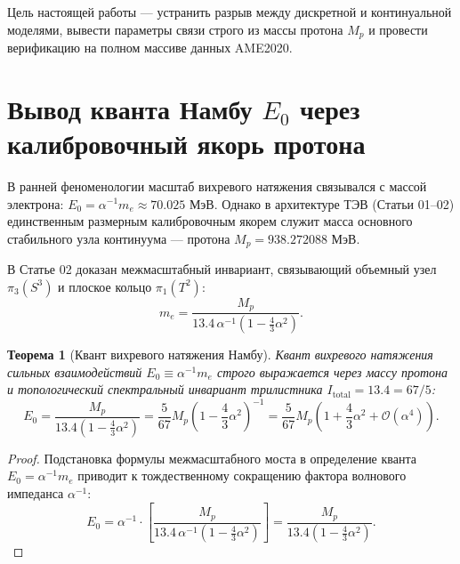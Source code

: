 \documentclass[11pt,a4paper]{article}
\newtheorem{theorem}{Теорема}
\theoremstyle{definition}
\theoremstyle{remark}
\begin{document}
Цель настоящей работы — устранить разрыв между дискретной и континуальной моделями, вывести параметры связи строго из массы протона $M_p$ и провести верификацию на полном массиве данных AME2020.

\section{Вывод кванта Намбу $E_0$ через калибровочный якорь протона}
В ранней феноменологии масштаб вихревого натяжения связывался с массой электрона: $E_0 = \alpha^{-1} m_e \approx 70.025\text{ МэВ}$. Однако в архитектуре ТЭВ (Статьи 01--02) единственным размерным калибровочным якорем служит масса основного стабильного узла континуума — протона $M_p = 938.272088\text{ МэВ}$.

В Статье 02 доказан межмасштабный инвариант, связывающий объемный узел $\pi_3(S^3)$ и плоское кольцо $\pi_1(T^2)$:
\begin{equation}
    m_e = \frac{M_p}{13.4 \, \alpha^{-1} \left(1 - \frac{4}{3}\alpha^2\right)}.
\end{equation}

\begin{theorem}[Квант вихревого натяжения Намбу]
\label{thm:nambu_proton}
Квант вихревого натяжения сильных взаимодействий $E_0 \equiv \alpha^{-1} m_e$ строго выражается через массу протона и топологический спектральный инвариант трилистника $I_{\mathrm{total}} = 13.4 = 67/5$:
\begin{equation}
    E_0 = \frac{M_p}{13.4 \left(1 - \frac{4}{3}\alpha^2\right)} = \frac{5}{67} M_p \left(1 - \frac{4}{3}\alpha^2\right)^{-1} = \frac{5}{67} M_p \left(1 + \frac{4}{3}\alpha^2 + \mathcal{O}(\alpha^4)\right).
\end{equation}
\end{theorem}
\begin{proof}
Подстановка формулы межмасштабного моста в определение кванта $E_0 = \alpha^{-1} m_e$ приводит к тождественному сокращению фактора волнового импеданса $\alpha^{-1}$:
\begin{equation}
    E_0 = \alpha^{-1} \cdot \left[ \frac{M_p}{13.4 \, \alpha^{-1} \left(1 - \frac{4}{3}\alpha^2\right)} \right] = \frac{M_p}{13.4 \left(1 - \frac{4}{3}\alpha^2\right)}.
\end{equation}
\end{proof}
\end{document}

